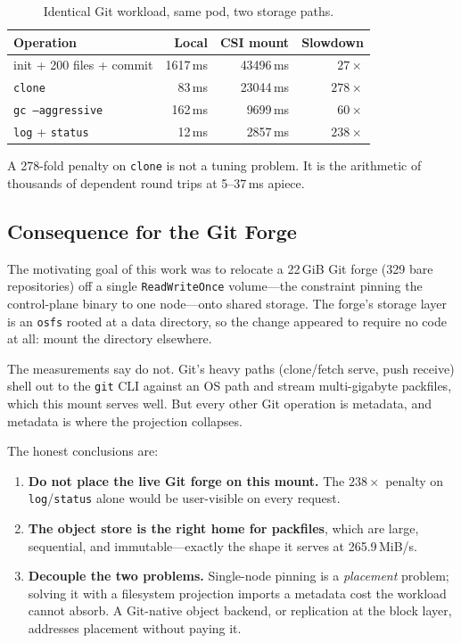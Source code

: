 \documentclass[11pt]{article}
\begin{document}
\begin{table}[h]
\centering
\begin{tabular}{lrrr}
\toprule
Operation & Local & CSI mount & Slowdown \\
\midrule
init + 200 files + commit & 1617\,ms & 43496\,ms & \(27\times\) \\
\texttt{clone}            & 83\,ms   & 23044\,ms & \(278\times\) \\
\texttt{gc --aggressive}  & 162\,ms  & 9699\,ms  & \(60\times\) \\
\texttt{log} + \texttt{status} & 12\,ms & 2857\,ms & \(238\times\) \\
\bottomrule
\end{tabular}
\caption{Identical Git workload, same pod, two storage paths.}
\end{table}

A 278-fold penalty on \texttt{clone} is not a tuning problem. It is
the arithmetic of thousands of dependent round trips at 5--37\,ms
apiece.

\subsection{Consequence for the Git Forge}

The motivating goal of this work was to relocate a 22\,GiB Git forge
(329 bare repositories) off a single \texttt{ReadWriteOnce} volume---the
constraint pinning the control-plane binary to one node---onto shared
storage. The forge's storage layer is an \texttt{osfs} rooted at a data
directory, so the change appeared to require no code at all: mount the
directory elsewhere.

The measurements say do not. Git's heavy paths (clone/fetch serve, push
receive) shell out to the \texttt{git} CLI against an OS path and stream
multi-gigabyte packfiles, which this mount serves well. But every other Git
operation is metadata, and metadata is where the projection collapses.

The honest conclusions are:
\begin{enumerate}
  \item \textbf{Do not place the live Git forge on this mount.} The
        \(238\times\) penalty on \texttt{log}/\texttt{status} alone would be
        user-visible on every request.
  \item \textbf{The object store is the right home for packfiles}, which are
        large, sequential, and immutable---exactly the shape it serves at
        265.9\,MiB/s.
  \item \textbf{Decouple the two problems.} Single-node pinning is a
        \emph{placement} problem; solving it with a filesystem projection
        imports a metadata cost the workload cannot absorb. A Git-native
        object backend, or replication at the block layer, addresses
        placement without paying it.
\end{enumerate}
\end{document}
